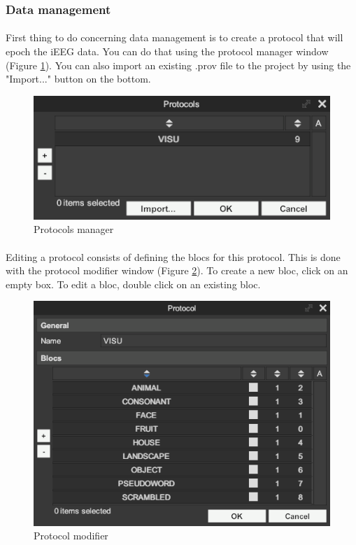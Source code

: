 \documentclass[a4paper]{article}
\begin{document}
\subsubsection{Data management}
\paragraph{} First thing to do concerning data management is to create a protocol that will epoch the iEEG data. You can do that using the protocol manager window (Figure \ref{protocolGestionUI}). You can also import an existing .prov file to the project by using the "Import..." button on the bottom.
\begin{figure}[H]
\begin{center}
\includegraphics[scale=0.5]{ProtocolGestion.png}
\end{center}
\caption{\label{protocolGestionUI}Protocols manager}
\end{figure}
\paragraph{} Editing a protocol consists of defining the blocs for this protocol. This is done with the protocol modifier window (Figure \ref{protocolModifierUI}). To create a new bloc, click on an empty box. To edit a bloc, double click on an existing bloc.
\begin{figure}[H]
\begin{center}
\includegraphics[scale=0.4]{ProtocolModifier.png}
\end{center}
\caption{\label{protocolModifierUI}Protocol modifier}
\end{figure}
\end{document}
